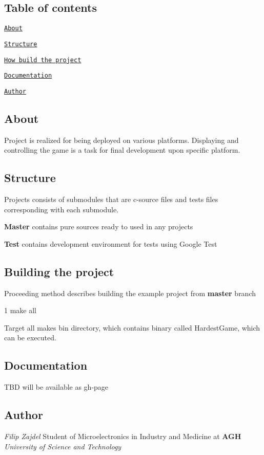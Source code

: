 \subsection*{Table of contents}


\begin{DoxyEnumerate}
\item \href{#about}{\tt About}
\item \href{#structure}{\tt Structure}
\item \href{#building-the-project}{\tt How build the project}
\item \href{#documentation}{\tt Documentation}
\item \href{#author}{\tt Author}
\end{DoxyEnumerate}

\subsection*{About}

Project is realized for being deployed on various platforms. Displaying and controlling the game is a task for final development upon specific platform.

\subsection*{Structure}

Projects consists of submodules that are c-\/source files and tests files corresponding with each submodule.

{\bfseries Master} contains pure sources ready to used in any projects

{\bfseries Test} contains development environment for tests using Google Test

\subsection*{Building the project}

Proceeding method describes building the example project from {\bfseries master} branch


\begin{DoxyCode}
1 make all
\end{DoxyCode}


Target all makes bin directory, which contains binary called Hardest\+Game, which can be executed.

\subsection*{Documentation}

T\+BD will be available as gh-\/page

\subsection*{Author}

{\itshape Filip Zajdel} Student of Microelectronics in Industry and Medicine at {\bfseries A\+GH} {\itshape University of Science and Technology} 